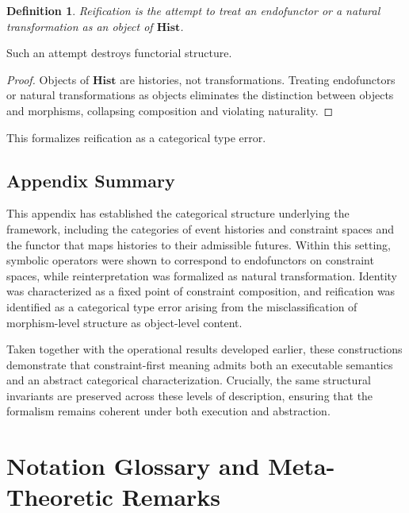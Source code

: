 \documentclass[11pt]{article}
\newtheorem{definition}{Definition}
\begin{document}
\begin{definition}
Reification is the attempt to treat an endofunctor or a natural transformation as
an object of $\mathbf{Hist}$.
\end{definition}

\begin{lemma}
Such an attempt destroys functorial structure.
\end{lemma}

\begin{proof}
Objects of $\mathbf{Hist}$ are histories, not transformations. Treating
endofunctors or natural transformations as objects eliminates the distinction
between objects and morphisms, collapsing composition and violating naturality.
\end{proof}

This formalizes reification as a categorical type error.

\subsection{Appendix Summary}

This appendix has established the categorical structure underlying the framework,
including the categories of event histories and constraint spaces and the functor
that maps histories to their admissible futures. Within this setting, symbolic
operators were shown to correspond to endofunctors on constraint spaces, while
reinterpretation was formalized as natural transformation. Identity was
characterized as a fixed point of constraint composition, and reification was
identified as a categorical type error arising from the misclassification of
morphism-level structure as object-level content.

Taken together with the operational results developed earlier, these constructions
demonstrate that constraint-first meaning admits both an executable semantics and
an abstract categorical characterization. Crucially, the same structural
invariants are preserved across these levels of description, ensuring that the
formalism remains coherent under both execution and abstraction.

\newpage
\section{Notation Glossary and Meta-Theoretic Remarks}
\end{document}
